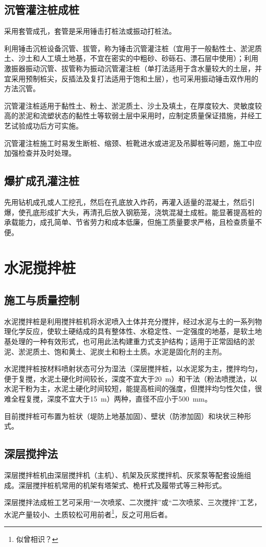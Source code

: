 \documentclass{book}
\begin{document}
\subsection{沉管灌注桩成桩}
\par 采用套管成孔，套管是采用锤击打桩法或振动打桩法。
\par 利用锤击沉桩设备沉管、拔管，称为锤击沉管灌注桩（宜用于一般黏性土、淤泥质土、沙土和人工填土地基，不宜在密实的中粗砂、砂砾石、漂石层中使用）；利用激振器振动沉管、拔管称为振动沉管灌注桩（单打法适用于含水量较大的土层，并宜采用预制桩尖，反插法及复打法适用于饱和土层），也可采用振动锤击双作用的方法沉管。
\par 沉管灌注桩适用于黏性土、粉土、淤泥质土、沙土及填土，在厚度较大、灵敏度较高的淤泥和流塑状态的黏性土等软弱土层中采用时，应制定质量保证措施，并经工艺试验成功后方可实施。
\par 沉管灌注桩施工时易发生断桩、缩颈、桩靴进水或进泥及吊脚桩等问题，施工中应加强检查并及时处理。
\subsection{爆扩成孔灌注桩}
\par 先用钻机成孔或人工挖孔，然后在孔底放入炸药，再灌入适量的混凝土，然后引爆，使孔底形成扩大头，再清孔后放入钢筋笼，浇筑混凝土成桩。能显著提高桩的承载能力，成孔简单、节省劳力和成本低廉，但施工质量要求严格，且检查质量不便。
\section{水泥搅拌桩}
\subsection{施工与质量控制}
\par 水泥搅拌桩是利用搅拌桩机将水泥喷入土体并充分搅拌，经过水泥与土的一系列物理化学反应，使软土硬结成的具有整体性、水稳定性、一定强度的地基，是软土地基处理的一种有效形式，也可用此法构建重力式支护结构；适用于正常固结的淤泥、淤泥质土、饱和黄土、泥炭土和粉土土质。水泥是固化剂的主剂。
\par 水泥搅拌桩按材料喷射状态可分为湿法（深层搅拌桩，以水泥浆为主，搅拌均匀，便于复搅，水泥土硬化时间较长，深度不宜大于\SI{20}{\m}）和干法（粉法喷搅法，以水泥干粉为主，水泥土硬化时间较短，能提高桩间的强度，但搅拌均匀性欠佳，很难全程复搅，深度不宜大于\SI{15}{\m}）两种，直径不应小于\SI{500}{\mm}。
\par 目前搅拌桩可布置为桩状（堤防上地基加固）、壁状（防渗加固）和块状三种形式。
\subsection{深层搅拌法}
\par 深层搅拌桩机由深层搅拌机（主机）、机架及灰浆搅拌机、灰浆泵等配套设施组成。深层搅拌桩机常用的机架有塔架式、桅杆式及履带式等三种形式。
\par 深层搅拌法成桩工艺可采用“一次喷浆、二次搅拌”或“二次喷浆、三次搅拌”工艺，水泥产量较小、土质较松可用前者\footnote{似曾相识？}，反之可用后者。
\end{document}
